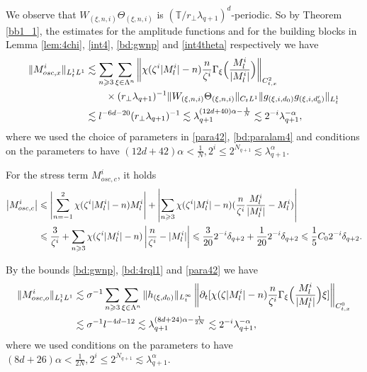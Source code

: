 \documentclass[UTF-8,reqno]{amsart}
\numberwithin{equation}{section}
\theoremstyle{definition}
\def\({{\Big(}}
\def\){{\Big)}}
\newcommand{\norm}[1]{\left\|#1\right\|}
\def\geq{\geqslant}
\def\leq{\leqslant}
\def\({{\Big(}}
\def\){{\Big)}}
\def\geq{\geqslant}
\def\leq{\leqslant}
\begin{document}
We observe that $W_{(\xi,n,i)}\Theta_{(\xi,n,i)}$ is $(\mathbb{T}/r_\perp\lambda_{q+1})^d$-periodic. So by  Theorem \ref{bb1_1},  the estimates for the amplitude functions and for the building blocks  in Lemma \ref{lem:4chi}, \eqref{int4},  \eqref{bd:gwnp} and \eqref{int4theta} respectively    we have
\begin{align}
\|M^{i}_{osc,x} \|_{L^1_tL^1}
&\lesssim\sum_{n\geq3}\sum_{\xi\in\Lambda^{n}}\norm{\chi(\zeta^{i}|M^{i}_l|-n)\frac{n}{\zeta^{i}}\Gamma_{\xi}\(\frac{M^{i}_l}{|M^{i}_l|}\)}_{C_{t,x}^2}\notag\\ 
&\quad\quad\times (r_\perp\lambda_{q+1})^{-1}\|W_{(\xi,n,i)}\Theta_{(\xi,n,i)}\|_{C_tL^{1}}\|g_{(\xi,i,d_0)}g_{(\xi,i,d_0')}\|_{L_t^1}\notag\\
&\lesssim l^{-6d-20}(r_\perp\lambda_{q+1})^{-1}\lesssim \lambda_{q+1}^{(12d+40)\alpha-\frac{1}{N}}
\lesssim2^{-i} \lambda_{q+1}^{-\alpha}, \notag
\end{align}
where we used the choice of parameters in \eqref{para42}, \eqref{bd:paralam4} and  conditions on the parameters to have $(12d+42)\alpha<\frac{1}{N},2^i\leq2^{N_{q+1}}\lesssim \lambda_{q+1}^\alpha$.

For the stress term $M^{i}_{osc,c}$, it holds
\begin{align}
     \left| M_{osc,c}^i\right|&\leq \left|  \sum_{n=-1}^{2}\chi(\zeta^i|M_l^i|-n)M_l^i\right|+\left|\sum_{n\geq3}\chi(\zeta^i|M_l^i|-n)(\frac{n}{\zeta^i}\frac{M_l^i}{|M_l^i|}- M_l^i)\right|\notag\\
     &\leq \frac{3}{\zeta^i}+\sum_{n\geq3}\chi(\zeta^i|M_l^i|-n)\left|\frac{n}{\zeta^i}- |M_l^i|\right|\leq \frac{3}{20}2^{-i}\delta_{q+2}+\frac{1}{20}2^{-i}\delta_{q+2}
     \leq \frac15C_02^{-i}\delta_{q+2}.\notag
\end{align}

 By the bounds  \eqref{bd:gwnp}, \eqref{bd:4rql1} and \eqref{para42}  we have
\begin{align}
   \|  M^{i}_{osc,o}\|_{L^1_tL^1}&\lesssim \sigma^{-1}\sum_{n\geq3}\sum_{\xi\in\Lambda^{n}}\|h_{(\xi,d_0)}\|_{L_t^\infty}\norm{\partial_t[\chi(\zeta|M_l^i|-n)\frac{n}{\zeta^i}\Gamma_{\xi}\(\frac{M_l^i}{|M_l^i|}\)\xi]}_{C_{t,x}^0}\notag\\ 
   &\lesssim  \sigma^{-1}l^{-4d-12}
   \lesssim \lambda_{q+1}^{(8d+24)\alpha-\frac1{2N}}
   \lesssim 2^{-i}\lambda_{q+1}^{-\alpha},\notag
\end{align}
where we used   conditions on the parameters to have $(8d+26)\alpha<\frac{1}{2N},2^i\leq2^{N_{q+1}}\lesssim \lambda_{q+1}^\alpha$. %
\end{document}
